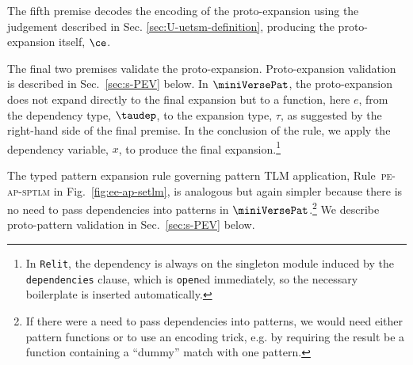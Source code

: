 \documentclass[acmsmall]{acmart}
\newcommand{\lifootnote}[1]{\lstinline[basicstyle=\ttfamily\fontsize{7pt}{1em}\selectfont]{#1}}
\begin{document}
The fifth premise decodes the encoding of the proto-expansion using the judgement described in Sec. \ref{sec:U-uetsm-definition}, producing the proto-expansion itself, $\ce$. 

The final two premises validate the proto-expansion. Proto-expansion validation is described in Sec.~\ref{sec:s-PEV} below. In $\miniVersePat$, the proto-expansion does not expand directly to the final expansion but to a function, here $e$, from the dependency type, $\taudep$, to the expansion type, $\tau$, as suggested by the right-hand side of the final premise. In the conclusion of the rule, we apply the dependency variable, $x$, to produce the final expansion.\footnote{In \lifootnote{Relit}, the dependency is always on the singleton module induced by the \lifootnote{dependencies} clause, which is \lifootnote{open}ed immediately, so the necessary boilerplate is inserted automatically.%
}

The typed pattern expansion rule governing pattern TLM application, Rule~\textsc{pe-ap-sptlm} in Fig.~\ref{fig:ee-ap-setlm}, is analogous but again simpler because there is no need to pass dependencies into patterns in $\miniVersePat$.\footnote{If there were a need to pass dependencies into patterns, we would need either pattern functions or to use an encoding trick, e.g. by requiring the result be a function containing a ``dummy'' match with one pattern.} We describe proto-pattern validation in Sec.~\ref{sec:s-PEV} below.
\end{document}
